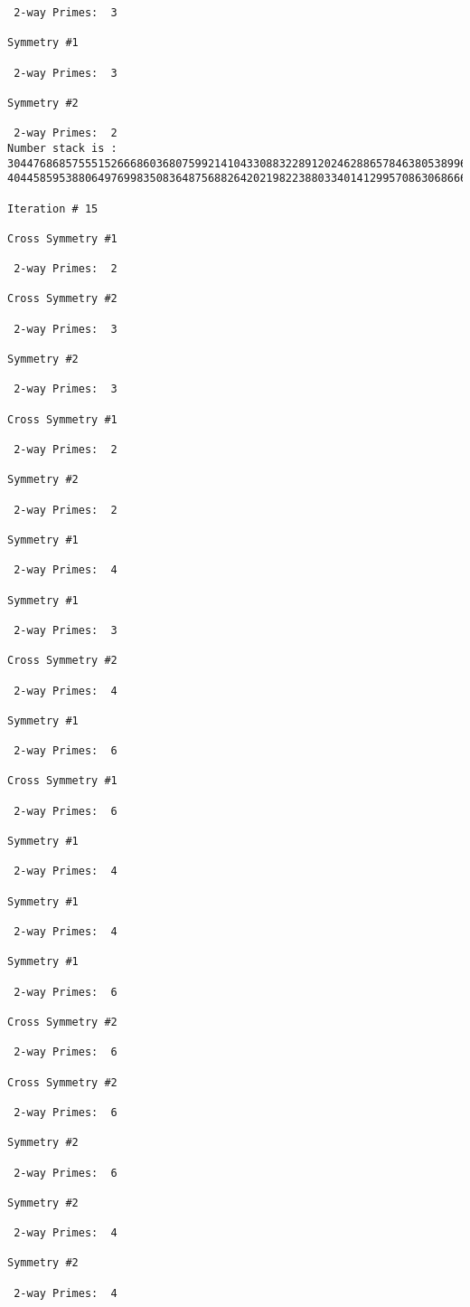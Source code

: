{{{{\begin{verbatim}
 2-way Primes: 	3

Symmetry #1

 2-way Primes: 	3

Symmetry #2

 2-way Primes: 	2
Number stack is :
30447686857555152666860368075992141043308832289120246288657846380538996794608835958544046240163340857
40445859538806497699835083648756882642021982238803340141299570863068666251555758686744037580433610426

Iteration #	15

Cross Symmetry #1

 2-way Primes: 	2

Cross Symmetry #2

 2-way Primes: 	3

Symmetry #2

 2-way Primes: 	3

Cross Symmetry #1

 2-way Primes: 	2

Symmetry #2

 2-way Primes: 	2

Symmetry #1

 2-way Primes: 	4

Symmetry #1

 2-way Primes: 	3

Cross Symmetry #2

 2-way Primes: 	4

Symmetry #1

 2-way Primes: 	6

Cross Symmetry #1

 2-way Primes: 	6

Symmetry #1

 2-way Primes: 	4

Symmetry #1

 2-way Primes: 	4

Symmetry #1

 2-way Primes: 	6

Cross Symmetry #2

 2-way Primes: 	6

Cross Symmetry #2

 2-way Primes: 	6

Symmetry #2

 2-way Primes: 	6

Symmetry #2

 2-way Primes: 	4

Symmetry #2

 2-way Primes: 	4


\end{verbatim}}}}}
